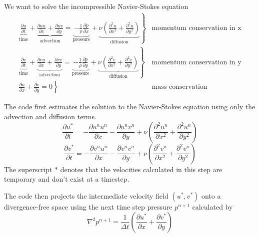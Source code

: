 \documentclass[12pt]{article}
\begin{document}
We want to solve the incompressible Navier-Stokes equation
\begin{align*}
  \left. \underbrace{\frac{\partial u}{\partial t}}_\textrm{time} +  \underbrace{\frac{\partial u u}{\partial x} + \frac{\partial u v}{\partial y}}_\textrm{advection} = \underbrace{- \frac{1}{\rho}\frac{\partial p}{\partial x}}_\textrm{pressure} + \underbrace{\nu \left(\frac{\partial^2 u}{\partial x^2} + \frac{\partial^2 u}{\partial y^2}\right) }_\textrm{diffusion} \right\} &\textrm{momentum conservation in x} \\
  \left. \underbrace{\frac{\partial v}{\partial t}}_\textrm{time} +  \underbrace{\frac{\partial v u}{\partial x} + \frac{\partial v v}{\partial y}}_\textrm{advection} = \underbrace{- \frac{1}{\rho}\frac{\partial p}{\partial y}}_\textrm{pressure} + \underbrace{\nu \left(\frac{\partial^2 v}{\partial x^2} + \frac{\partial^2 v}{\partial y^2}\right) }_\textrm{diffusion} \right\} &\textrm{momentum conservation in y} \\
\left. \frac{\partial u}{\partial x} + \frac{\partial v}{\partial y}  = 0 \right\} &\textrm{mass conservation}
\end{align*}

The code first estimates the solution to the Navier-Stokes equation using only the advection and diffusion terms. 
\begin{equation}
 \frac{\partial u^*}{\partial t} =   -\frac{\partial u^n u^n}{\partial x} -\frac{\partial u^n v^n}{\partial y} + \nu\left( \frac{\partial^2 u^n}{\partial x^2} + \frac{\partial^2 u^n}{\partial y^2}  \right) 
 \label{predictx}
\end{equation}
\begin{equation}
  \frac{\partial v^*}{\partial t} =   -\frac{\partial v^n u^n}{\partial x} -\frac{\partial v^n v^n}{\partial y} + \nu\left( \frac{\partial^2 v^n}{\partial x^2} + \frac{\partial^2 v^n}{\partial y^2}  \right)
 \label{predicty}
\end{equation}
The superscript $*$ denotes that the velocities calculated in this step are temporary and don't exist at a timestep.

The code then projects the intermediate velocity field $(u^*,v^*)$ onto a divergence-free space using the next time step pressure $p^{n+1}$ calculated by
\begin{equation}
\nabla^2 p^{n+1} = \frac{1}{\Delta t}\left( \frac{\partial u^*}{\partial x} + \frac{\partial v^*}{\partial y} \right)
\label{poisson}
\end{equation}
\end{document}
